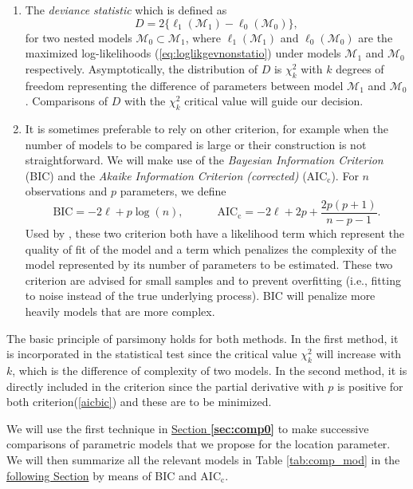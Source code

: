 \begin{enumerate}
	\item The \emph{deviance statistic} which is defined as 
	\begin{equation}
	D = 2\big\{\ell_1(\mathcal{M}_1)-\ell_0(\mathcal{M}_0)\big\},
	\end{equation}
	for two nested models $\mathcal{M}_0\subset \mathcal{M}_1$, where $\ell_1(\mathcal{M}_1)$ and $\ell_0(\mathcal{M}_0)$ are the maximized log-likelihoods (\ref{eq:loglikgevnonstatio}) under models $\mathcal{M}_1$ and $\mathcal{M}_0$ respectively.
	Asymptotically, the distribution of $D$ is $\chi^2_k$ with $k$ degrees of freedom representing the difference of parameters between model $\mathcal{M}_1$ and $\mathcal{M}_0$. Comparisons of $D$ with the $\chi^2_k$ critical value will guide our decision.  
	
	\item\label{i:aicbic} It is sometimes preferable to rely on other criterion, for example when the number of models to be compared is large or their construction is not straightforward. We will make use of the \emph{Bayesian Information Criterion} (BIC) and  the \emph{Akaike Information Criterion (corrected) } ($\text{AIC}_{\text{c}}$). For $n$ observations and $p$ parameters, 
we define 
	\begin{equation}\label{aicbic}
\text{BIC} = -2\ell+ p\log(n), \qquad\quad \text{AIC}_{\text{c}}=-2\ell+2p+\frac{2p(p+1)}{n-p-1}.
	\end{equation}
	 Used by \citet{cannon_flexible_2010}, these two criterion both have a likelihood term which represent the quality of fit of the model and a term which penalizes the complexity of the model represented by its number of parameters to be estimated. These two criterion are advised for small samples and to prevent overfitting (i.e., fitting to noise instead of the true underlying process). BIC will penalize more heavily models that are more complex.
\end{enumerate}
The basic principle of parsimony holds for both methods. In the first method, it is incorporated in the statistical test since the critical value $\chi^2_k$ will increase with $k$, which is the difference of complexity of two models. In the second method, it is directly included in the criterion since the partial derivative with $p$ is positive for both criterion(\ref{aicbic}) and these are to be minimized. %

We will use the first technique in \hyperref[sec:comp0]{Section \textbf{\ref{sec:comp0}}} to make successive comparisons of parametric models that we propose for the location parameter. We will then summarize all the relevant models in Table \ref{tab:comp_mod} in the \hyperref[sec:nnxp]{following Section} by means of BIC and $\text{AIC}_{\text{c}}$.


